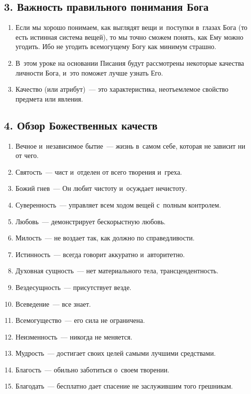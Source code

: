 \documentclass[a4paper,12pt]{article}
\begin{document}
\subsection{3. Важность правильного понимания Бога}
\begin{enumerate}
    \item Если мы хорошо понимаем, как выглядят вещи и~поступки в~глазах Бога (то есть истинная система вещей), то мы точно сможем понять, как Ему можно угодить. Ибо не угодить всемогущему Богу как минимум страшно. 
    \item В~этом уроке на основании Писания будут рассмотрены некоторые качества личности Бога, и~это поможет лучше узнать Его.
    \item Качество (или атрибут)~--- это характеристика, неотъемлемое свойство предмета или явления. 
\end{enumerate}

\subsection{4.  Обзор Божественных качеств}
\begin{enumerate}
    \item Вечное и~независимое бытие~--- жизнь в~самом себе, которая не зависит ни от чего.
    \item Святость~--- чист и~отделен от всего творения и~греха.
    \item Божий гнев~--- Он любит чистоту и~осуждает нечистоту.
    \item Суверенность~--- управляет всем ходом вещей с~полным контролем.
    \item Любовь~--- демонстрирует бескорыстную любовь. 
    \item Милость~--- не воздает так, как должно по справедливости.
    \item Истинность~--- всегда говорит аккуратно и~авторитетно.
    \item Духовная сущность~--- нет материального тела, трансцендентность.
    \item Вездесущность~--- присутствует везде.
    \item Всеведение~--- все знает.
    \item Всемогущество~--- его сила не ограничена.
    \item Неизменность~--- никогда не меняется.
    \item Мудрость~--- достигает своих целей самыми лучшими средствами.
    \item Благость~--- обильно заботиться о~своем творении.
    \item Благодать~--- бесплатно дает спасение не заслужившим того грешникам.
\end{enumerate}
\end{document}
